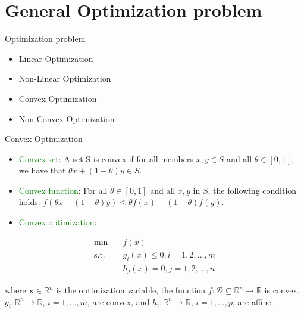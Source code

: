 \section{General Optimization problem}

    \frame{\sectionpage}

    \begin{frame}{Optimization problem}
      \begin{itemize}
        \item Linear Optimization
        \item Non-Linear Optimization
      \end{itemize}

      \begin{itemize}
        \item Convex Optimization
        \item Non-Convex Optimization
      \end{itemize}
    \end{frame}

    \begin{frame}{Convex Optimization}
      \begin{itemize}
        \item \textcolor{green}{Convex set}:
        A set S is convex if for all members $ x,y\in S $ and all $ \theta \in [0,1] $, we have that $ \theta x+(1-\theta )y\in S $.
        \item \textcolor{green}{Convex function}:
        For all $\theta \in [0,1] $ and all $ x,y $ in $S$, the following condition holds: $f(\theta x+(1-\theta )y)\leq \theta f(x)+(1-\theta )f(y) $.

        \item \textcolor{green}{Convex optimization}:
      \end{itemize}
      \begin{equation*}
        \begin{align}
        \min &\quad f(x) \\
        \text{s.t.} &\quad g_i(x) \leq 0, i=1,2,...,m \\
          &\quad h_j(x) = 0, j = 1,2,...,n
        \end{align}
      \end{equation*}

      \quad where $ \mathbf {x} \in \mathbb {R} ^{n} $ is the optimization variable, the function $ f:{\mathcal {D}}\subseteq \mathbb {R} ^{n}\to \mathbb {R} $ is convex, $ g_{i}:\mathbb {R} ^{n}\to \mathbb {R} $, $ i=1,\ldots ,m $, are convex, and $ h_{i}:\mathbb {R} ^{n}\to \mathbb {R} $, $ i=1,\ldots ,p $, are affine.
    \end{frame}

